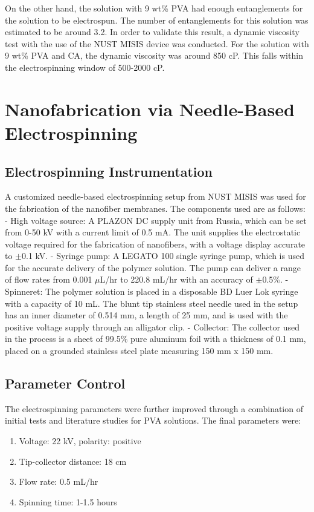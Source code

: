 \documentclass[12pt,a4paper]{report}
\begin{document}
On the other hand, the solution with 9 wt\% PVA had enough entanglements for the solution to be electrospun. The number of entanglements for this solution was estimated to be around 3.2. In order to validate this result, a dynamic viscosity test with the use of the NUST MISIS device was conducted. For the solution with 9 wt\% PVA and CA, the dynamic viscosity was around 850 cP. This falls within the electrospinning window of 500-2000 cP.\cite{46,47}

\section{Nanofabrication via Needle-Based Electrospinning}
\subsection{Electrospinning Instrumentation}
A customized needle-based electrospinning setup from NUST MISIS was used for the fabrication of the nanofiber membranes. The components used are as follows:
- High voltage source: A PLAZON DC supply unit from Russia, which can be set from 0-50 kV with a current limit of 0.5 mA. The unit supplies the electrostatic voltage required for the fabrication of nanofibers, with a voltage display accurate to \(\pm\)0.1 kV.
- Syringe pump: A LEGATO 100 single syringe pump, which is used for the accurate delivery of the polymer solution. The pump can deliver a range of flow rates from 0.001 \(\mu\)L/hr to 220.8 mL/hr with an accuracy of \(\pm\)0.5\%.
- Spinneret: The polymer solution is placed in a disposable BD Luer Lok syringe with a capacity of 10 mL. The blunt tip stainless steel needle used in the setup has an inner diameter of 0.514 mm, a length of 25 mm, and is used with the positive voltage supply through an alligator clip.
- Collector: The collector used in the process is a sheet of 99.5\% pure aluminum foil with a thickness of 0.1 mm, placed on a grounded stainless steel plate measuring 150 mm x 150 mm.

\subsection{Parameter Control}
The electrospinning parameters were further improved through a combination of initial tests and literature studies for PVA solutions. The final parameters were:
\begin{enumerate}
    \item Voltage: 22 kV, polarity: positive
    \item Tip-collector distance: 18 cm
    \item  Flow rate: 0.5 mL/hr
    \item Spinning time: 1-1.5 hours
\end{enumerate}
\end{document}
